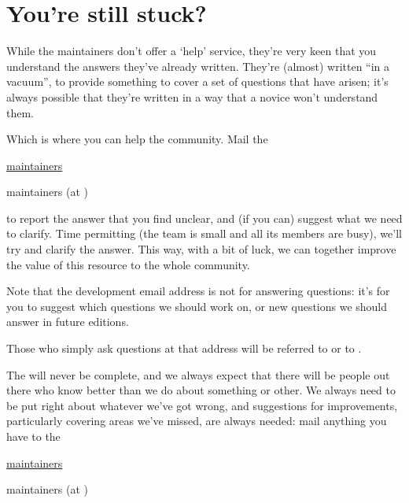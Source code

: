 
\section{You're still stuck?}


While the  maintainers don't offer a `help' service, they're
very keen that you understand the answers they've already written.
They're (almost) written ``in a vacuum'', to provide something to
cover a set of questions that have arisen; it's always possible that
they're written in a way that a novice won't understand them.

Which is where you can help the community.  Mail the 
\begin{wideversion}
  \href{mailto:faq-devel@tex.ac.uk}{maintainers}
\end{wideversion}
\begin{narrowversion}
  maintainers (at )
\end{narrowversion}
to report the answer that you find unclear, and (if you can) suggest
what we need to clarify.  Time permitting (the team is small and all
its members are busy), we'll try and clarify the answer.  This way,
with a bit of luck, we can together improve the value of this resource
to the whole community.

Note that the  development email address is not for
answering questions: it's for you to suggest which questions we should
work on, or new questions we should answer in future editions.

Those who simply ask questions at that address will be referred to
 or to .


The  will never be complete, and we always expect that
there will be people out there who know better than we do about
something or other.  We always need to be put right about whatever
we've got wrong, and suggestions for improvements, particularly
covering areas we've missed, are always needed: mail anything you have
to the
\begin{wideversion}
  \href{mailto:faq-devel@tex.ac.uk}{maintainers}
\end{wideversion}
\begin{narrowversion}
  maintainers (at )
\end{narrowversion}

